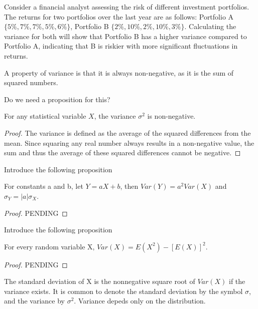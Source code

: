 \begin{example}
Consider a financial analyst assessing the risk of different investment portfolios. The returns for two portfolios over the last year are as follows: Portfolio A $\{ 5\%, 7\%, 7\%, 5\%, 6\% \}$, Portfolio B $\{ 2\%, 10\%, 2\%, 10\%, 3\%\}$. Calculating the variance for both will show that Portfolio B has a higher variance compared to Portfolio A, indicating that B is riskier with more significant fluctuations in returns.
\end{example}

A property of variance is that it is always non-negative, as it is the sum of squared numbers.

{\color{red} Do we need a proposition for this?}

\begin{proposition}
For any statistical variable $X$, the variance $\sigma^2$ is non-negative.
\end{proposition}
\begin{proof}
The variance is defined as the average of the squared differences from the mean. Since squaring any real number always results in a non-negative value, the sum and thus the average of these squared differences cannot be negative.
\end{proof}

{\color{red} Introduce the following proposition}

\begin{proposition}
For constants a and b, let $Y=aX+b$, then $Var\left(Y\right)=a^{2}Var\left(X\right)$
and $\sigma_{Y}=\left|a\right|\sigma_{X}$.
\end{proposition}
\begin{proof}
{\color{red} PENDING}
\end{proof}

{\color{red} Introduce the following proposition}

\begin{proposition}
For every random variable X, $Var\left(X\right)=E\left(X^{2}\right)-\left[E\left(X\right)\right]^{2}$.
\end{proposition}
\begin{proof}
{\color{red} PENDING}
\end{proof}

{\color{red} The standard deviation of X is the nonnegative square root of $Var\left(X\right)$ if the variance exists. It is common to denote the standard deviation by the symbol $\sigma$, and the variance by $\sigma^{2}$. Variance depeds only on the distribution.}

